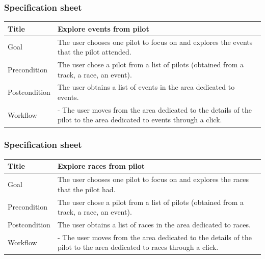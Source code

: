 \documentclass{beamer}
\begin{document}
\begin{frame}
    \frametitle{Specification sheet}
    \begin{table}
        \tiny
        \begin{tabular}{|p{2cm}|p{6cm}|}
        \hline
        Title & \textbf{Explore events from pilot} \\
        \hline
        Goal & The user chooses one pilot to focus on and explores the events that the pilot attended. \\
        \hline
        Precondition & The user chose a pilot from a list of pilots (obtained from a track, a race, an event).\\
        \hline
        Postcondition & The user obtains a list of events in the area dedicated to events. \\
        \hline
        Workflow &
        - The user moves from the area dedicated to the details of the pilot to the
        area dedicated to events through a click. \\
        \hline
        \end{tabular}
\end{table}
\end{frame}

\begin{frame}
    \frametitle{Specification sheet}
    \begin{table}
        \tiny
        \begin{tabular}{|p{2cm}|p{6cm}|}
        \hline
        Title & \textbf{Explore races from pilot} \\
        \hline
        Goal & The user chooses one pilot to focus on and explores the races that the pilot had. \\
        \hline
        Precondition & The user chose a pilot from a list of pilots (obtained from a track, a race, an event).\\
        \hline
        Postcondition & The user obtains a list of races in the area dedicated to races. \\
        \hline
        Workflow &
        - The user moves from the area dedicated to the details of the pilot to the
        area dedicated to races through a click. \\
        \hline
        \end{tabular}
\end{table}
\end{frame}

\end{document}
